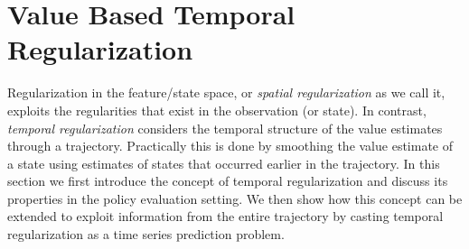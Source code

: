 \section{Value Based Temporal Regularization}
\label{sec:temp_reg}
Regularization in the feature/state space, or \emph{spatial regularization} as we call it, exploits the regularities that exist in the observation (or state). In contrast, \emph{temporal regularization} considers the temporal structure of the value estimates through a trajectory. Practically this is done by smoothing the value estimate of a state using estimates of states that occurred earlier in the trajectory.
In this section we first introduce the concept of temporal regularization and discuss its properties in the policy evaluation setting. We then show how this concept can be extended to exploit information from the entire trajectory by casting temporal regularization as a time series prediction problem. 

